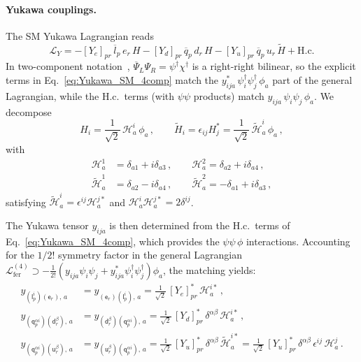 \paragraph{Yukawa couplings.}
The SM Yukawa Lagrangian reads
\begin{equation}\label{eq:Yukawa_SM_4comp}
    \mathcal{L}_Y = -[Y_e]_{pr}\, \overline{l}_{p}\, e_{r}\, H  - [Y_d]_{pr}\, \overline{q}_{p}\, d_{r}\, H - [Y_u]_{pr}\, \overline{q}_{p}\, u_{r}\, \widetilde{H} + \text{H.c.}
\end{equation}
In two-component notation~\cite{Dreiner:2008tw}, $\overline{\Psi}_{L}\Psi_{R} = \psi^\dagger\chi^\dagger$ is a right-right bilinear, so the explicit terms in Eq.~\eqref{eq:Yukawa_SM_4comp} match the $y^*_{ija}\,\psi^\dagger_i\psi^\dagger_j\,\phi_a$ part of the general Lagrangian, while the H.c.\ terms (with $\psi\psi$ products) match $y_{ija}\,\psi_i\psi_j\,\phi_a$. We decompose
\begin{equation}\label{eq:H_real_decomp}
    H_i = \frac{1}{\sqrt{2}}\,\mathcal{H}^i_a\,\phi_a\,,\qquad \widetilde{H}_i = \epsilon_{ij}H^*_j = \frac{1}{\sqrt{2}}\,\widetilde{\mathcal{H}}^i_a\,\phi_a\,,
\end{equation}
with
\begin{align}\label{eq:H_components}
    \mathcal{H}^1_a &= \delta_{a1}+i\delta_{a3}\,,\qquad \mathcal{H}^2_a = \delta_{a2}+i\delta_{a4}\,,\\
    \widetilde{\mathcal{H}}^1_a &= \delta_{a2}-i\delta_{a4}\,,\qquad \widetilde{\mathcal{H}}^2_a = -\delta_{a1}+i\delta_{a3}\,,\label{eq:Htilde_components}
\end{align}
satisfying $\widetilde{\mathcal{H}}^i_a = \epsilon^{ij}\mathcal{H}^{j *}_a$ and $\mathcal{H}^i_a \mathcal{H}^{j*}_a = 2\delta^{ij}$.

The Yukawa tensor $y_{ija}$ is then determined from the H.c.\ terms of Eq.~\eqref{eq:Yukawa_SM_4comp}, which provides the $\psi\psi\,\phi$ interactions. Accounting for the $1/2!$ symmetry factor in the general Lagrangian $\mathcal L^{(4)}_{\text{fer}} \supset -\frac{1}{2!}(y_{ija}\psi_i\psi_j + y_{ija}^* \psi_i^\dagger \psi^\dagger_j)\phi_a$, the matching yields:
\begin{align}
    y_{(\mathsf{l}^i_p)(\mathsf{e}_r),\,a} &= y_{(\mathsf{e}_r)(\mathsf{l}^i_p),\,a} = \frac{1}{\sqrt{2}}\,[Y_e]^*_{pr}\,\mathcal{H}^{i*}_a\,,\label{eq:ye_matching}\\
    y_{(\mathsf{q}^{\alpha i}_p)(\mathsf{d}_{r}^\beta),\,a} &= y_{(\mathsf{d}_{r}^\beta)(\mathsf{q}^{\alpha i}_p),\,a}=\frac{1}{\sqrt{2}}\,[Y_d]^*_{pr}\,\delta^{\alpha\beta}\,\mathcal{H}^{i*}_a\,,\label{eq:yd_matching}\\
    y_{(\mathsf{q}^{\alpha i}_p)(\mathsf{u}_{r}^\beta),\,a} &= y_{(\mathsf{u}_{r}^\beta)(\mathsf{q}^{\alpha i}_p),\,a}=\frac{1}{\sqrt{2}}\,[Y_u]^*_{pr}\,\delta^{\alpha\beta}\,\widetilde{\mathcal{H}}^{i*}_a = \frac{1}{\sqrt{2}}\,[Y_u]^*_{pr}\,\delta^{\alpha\beta}\,\epsilon^{ij}\,\mathcal{H}^{j}_a\,.\label{eq:yu_matching}
\end{align}

